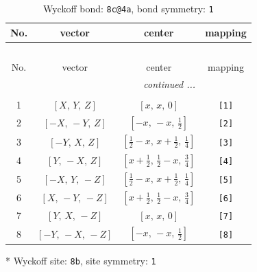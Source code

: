 \documentclass[fleqn,8pt]{jsarticle}
\begin{document}
\begin{longtable}{cccc}
\caption{Wyckoff bond: {\tt 8c@4a}, bond symmetry: {\tt 1}}
 \\
 \hline \hline
No. & vector & center & mapping \\ \hline \endfirsthead

\multicolumn{3}{l}{\tablename\ \thetable{}} \\
 \hline \hline
No. & vector & center & mapping \\ \hline \endhead

 \hline \hline
\multicolumn{3}{r}{\footnotesize\it continued ...} \\ \endfoot

 \hline \hline
\multicolumn{3}{r}{} \\ \endlastfoot

1 & $\left[ X,\, Y,\, Z \right]$ & $\left[ x,\, x,\, 0 \right]$ & {\tt [1]} \\ \hline
2 & $\left[ - X,\, - Y,\, Z \right]$ & $\left[ - x,\, - x,\, \frac{1}{2} \right]$ & {\tt [2]} \\ \hline
3 & $\left[ - Y,\, X,\, Z \right]$ & $\left[ \frac{1}{2} - x,\, x + \frac{1}{2},\, \frac{1}{4} \right]$ & {\tt [3]} \\ \hline
4 & $\left[ Y,\, - X,\, Z \right]$ & $\left[ x + \frac{1}{2},\, \frac{1}{2} - x,\, \frac{3}{4} \right]$ & {\tt [4]} \\ \hline
5 & $\left[ - X,\, Y,\, - Z \right]$ & $\left[ \frac{1}{2} - x,\, x + \frac{1}{2},\, \frac{1}{4} \right]$ & {\tt [5]} \\ \hline
6 & $\left[ X,\, - Y,\, - Z \right]$ & $\left[ x + \frac{1}{2},\, \frac{1}{2} - x,\, \frac{3}{4} \right]$ & {\tt [6]} \\ \hline
7 & $\left[ Y,\, X,\, - Z \right]$ & $\left[ x,\, x,\, 0 \right]$ & {\tt [7]} \\ \hline
8 & $\left[ - Y,\, - X,\, - Z \right]$ & $\left[ - x,\, - x,\, \frac{1}{2} \right]$ & {\tt [8]} \\
\end{longtable}
* Wyckoff site: {\tt 8b}, site symmetry: {\tt 1}
\renewcommand{\arraystretch}{1.2}
\end{document}
